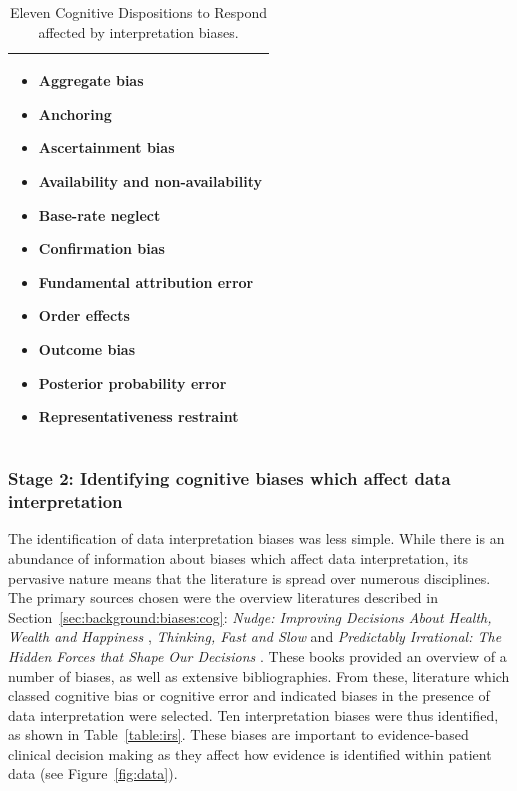 \documentclass[a4paper]{scrartcl}     %
\begin{document}
    \begin{table}
      \caption{Eleven Cognitive Dispositions to Respond affected by interpretation biases.}
      \renewcommand{\arraystretch}{0}
      \begin{tabu} to \linewidth {X[1,l]}
        \toprule
        \begin{multicols}{3}
         \begin{itemize}[label={}]
          \item Aggregate bias
          \item Anchoring
          \item Ascertainment bias
          \item Availability and non-availability
          \item Base-rate neglect
          \item Confirmation bias
          \item Fundamental attribution error
          \item Order effects
          \item Outcome bias
          \item Posterior probability error
          \item Representativeness restraint
        \end{itemize}
        \end{multicols} \\
        \bottomrule
      \end{tabu}
      \label{table:ibcdrs}
    \end{table}

  \subsubsection*{Stage 2: Identifying cognitive biases which affect data interpretation}

    The identification of data interpretation biases was less simple. While there is an abundance of information about biases which affect data interpretation, its pervasive nature means that the literature is spread over numerous disciplines.  The primary sources chosen were the overview literatures described in Section~\ref{sec:background:biases:cog}: \textit{Nudge: Improving Decisions About Health, Wealth and Happiness} \citep{Thaler2012}, \textit{Thinking, Fast and Slow} \citep{Kahneman2012} and \textit{Predictably Irrational: The Hidden Forces that Shape Our Decisions} \citep{Ariely2009}. These books provided an overview of a number of biases, as well as extensive bibliographies. From these, literature which classed cognitive bias or cognitive error and indicated biases in the presence of data interpretation were selected. Ten interpretation biases were thus identified, as shown in Table~\ref{table:irs}. These biases are important to evidence-based clinical decision making as they affect how evidence is identified within patient data (see Figure~\ref{fig:data}).
\end{document}
